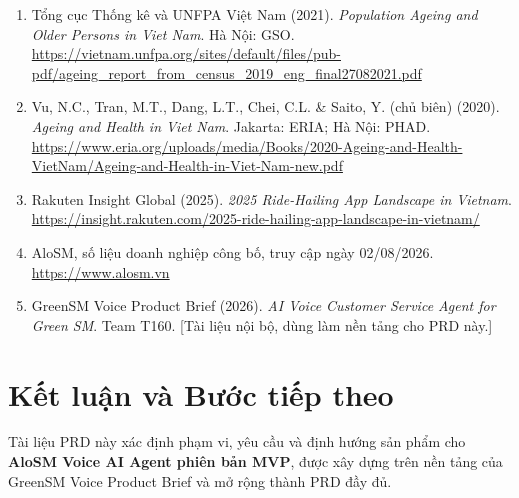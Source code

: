 \documentclass[12pt,a4paper]{article}
\begin{document}
\begin{enumerate}
  \item Tổng cục Thống kê và UNFPA Việt Nam (2021). \textit{Population Ageing and Older Persons in Viet Nam}. Hà Nội: GSO.\\
  \url{https://vietnam.unfpa.org/sites/default/files/pub-pdf/ageing_report_from_census_2019_eng_final27082021.pdf}

  \item Vu, N.C., Tran, M.T., Dang, L.T., Chei, C.L. \& Saito, Y. (chủ biên) (2020). \textit{Ageing and Health in Viet Nam}. Jakarta: ERIA; Hà Nội: PHAD.\\
  \url{https://www.eria.org/uploads/media/Books/2020-Ageing-and-Health-VietNam/Ageing-and-Health-in-Viet-Nam-new.pdf}

  \item Rakuten Insight Global (2025). \textit{2025 Ride-Hailing App Landscape in Vietnam}.\\
  \url{https://insight.rakuten.com/2025-ride-hailing-app-landscape-in-vietnam/}

  \item AloSM, số liệu doanh nghiệp công bố, truy cập ngày 02/08/2026.\\
  \url{https://www.alosm.vn}

  \item GreenSM Voice Product Brief (2026). \textit{AI Voice Customer Service Agent for Green SM}. Team T160. [Tài liệu nội bộ, dùng làm nền tảng cho PRD này.]
\end{enumerate}

\section*{Kết luận và Bước tiếp theo}

Tài liệu PRD này xác định phạm vi, yêu cầu và định hướng sản phẩm cho \textbf{AloSM Voice AI Agent phiên bản MVP}, được xây dựng trên nền tảng của GreenSM Voice Product Brief và mở rộng thành PRD đầy đủ.
\end{document}
